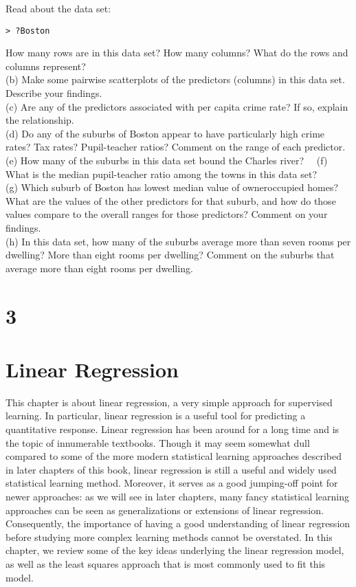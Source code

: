 \documentclass[10pt]{article}
\begin{document}
Read about the data set:

\begin{verbatim}
> ?Boston
\end{verbatim}

How many rows are in this data set? How many columns? What do the rows and columns represent?\\
(b) Make some pairwise scatterplots of the predictors (columns) in this data set. Describe your findings.\\
(c) Are any of the predictors associated with per capita crime rate? If so, explain the relationship.\\
(d) Do any of the suburbs of Boston appear to have particularly high crime rates? Tax rates? Pupil-teacher ratios? Comment on the range of each predictor.\\
(e) How many of the suburbs in this data set bound the Charles river?\
\
(f) What is the median pupil-teacher ratio among the towns in this data set?\\
(g) Which suburb of Boston has lowest median value of owneroccupied homes? What are the values of the other predictors for that suburb, and how do those values compare to the overall ranges for those predictors? Comment on your findings.\\
(h) In this data set, how many of the suburbs average more than seven rooms per dwelling? More than eight rooms per dwelling? Comment on the suburbs that average more than eight rooms per dwelling.


\section*{3}
\section*{Linear Regression}
This chapter is about linear regression, a very simple approach for supervised learning. In particular, linear regression is a useful tool for predicting a quantitative response. Linear regression has been around for a long time and is the topic of innumerable textbooks. Though it may seem somewhat dull compared to some of the more modern statistical learning approaches described in later chapters of this book, linear regression is still a useful and widely used statistical learning method. Moreover, it serves as a good jumping-off point for newer approaches: as we will see in later chapters, many fancy statistical learning approaches can be seen as generalizations or extensions of linear regression. Consequently, the importance of having a good understanding of linear regression before studying more complex learning methods cannot be overstated. In this chapter, we review some of the key ideas underlying the linear regression model, as well as the least squares approach that is most commonly used to fit this model.
\end{document}
